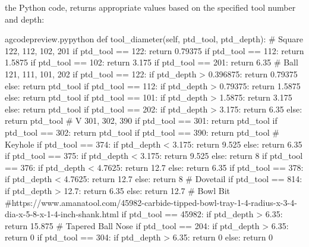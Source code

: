 \documentclass{ltxdoc}
\begin{document}
\noindent the Python code,  returns 
appropriate values based on the specified tool number and depth:
 
\lstset{firstnumber=\thegcpy}
\begin{writecode}{a}{gcodepreview.py}{python}
    def tool_diameter(self, ptd_tool, ptd_depth):
# Square 122, 112, 102, 201
        if ptd_tool == 122:
            return 0.79375
        if ptd_tool == 112:
            return 1.5875
        if ptd_tool == 102:
            return 3.175
        if ptd_tool == 201:
            return 6.35
# Ball 121, 111, 101, 202
        if ptd_tool == 122:
            if ptd_depth > 0.396875:
                return 0.79375
            else:
                return ptd_tool
        if ptd_tool == 112:
            if ptd_depth > 0.79375:
                return 1.5875
            else:
                return ptd_tool
        if ptd_tool == 101:
            if ptd_depth > 1.5875:
                return 3.175
            else:
                return ptd_tool
        if ptd_tool == 202:
            if ptd_depth > 3.175:
                return 6.35
            else:
                return ptd_tool
# V 301, 302, 390
        if ptd_tool == 301:
            return ptd_tool
        if ptd_tool == 302:
            return ptd_tool
        if ptd_tool == 390:
            return ptd_tool
# Keyhole
        if ptd_tool == 374:
            if ptd_depth < 3.175:
                return 9.525
            else:
                return 6.35
        if ptd_tool == 375:
            if ptd_depth < 3.175:
                return 9.525
            else:
                return 8
        if ptd_tool == 376:
            if ptd_depth < 4.7625:
                return 12.7
            else:
                return 6.35
        if ptd_tool == 378:
            if ptd_depth < 4.7625:
                return 12.7
            else:
                return 8
# Dovetail
        if ptd_tool == 814:
            if ptd_depth > 12.7:
                return 6.35
            else:
                return 12.7
# Bowl Bit
#https://www.amanatool.com/45982-carbide-tipped-bowl-tray-1-4-radius-x-3-4-dia-x-5-8-x-1-4-inch-shank.html 
        if ptd_tool == 45982:
            if ptd_depth > 6.35:
                return 15.875
# Tapered Ball Nose
        if ptd_tool == 204:
            if ptd_depth > 6.35:
                return 0
        if ptd_tool == 304:
            if ptd_depth > 6.35:
                return 0
            else:
                return 0

\end{writecode}
\addtocounter{gcpy}{80}
\end{document}
